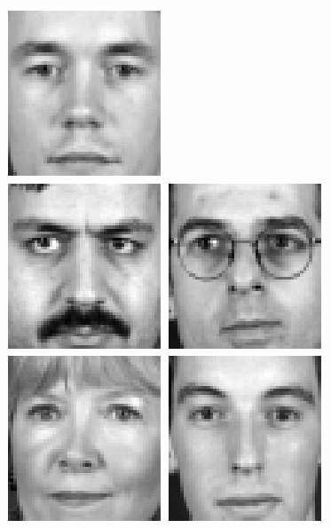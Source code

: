 \begin{figure}[ht]
\begin{center}
\includegraphics[scale=0.12]{ch4/figures/XM2VTS_16.png}\\
\includegraphics[scale=0.12]{ch4/figures/XM2VTS_17.png}
\includegraphics[scale=0.12]{ch4/figures/XM2VTS_18.png}
\includegraphics[scale=0.12]{ch4/figures/XM2VTS_19.png}
\includegraphics[scale=0.12]{ch4/figures/XM2VTS_20.png}

\end{center}
\end{figure}
